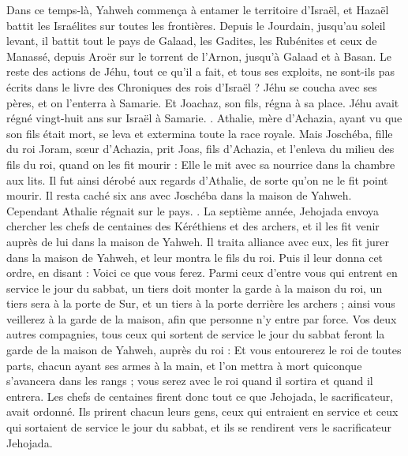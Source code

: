 \begin{multicols}{2}
Dans ce temps-là, Yahweh commença à entamer le territoire d'Israël, et Hazaël battit les Israélites sur toutes les frontières.
Depuis le Jourdain, jusqu'au soleil levant, il battit tout le pays de Galaad, les Gadites, les Rubénites et ceux de Manassé, depuis Aroër sur le torrent de l'Arnon, jusqu'à Galaad et à Basan.
Le reste des actions de Jéhu, tout ce qu'il a fait, et tous ses exploits, ne sont-ils pas écrits dans le livre des Chroniques des rois d'Israël ?
Jéhu se coucha avec ses pères, et on l'enterra à Samarie. Et Joachaz, son fils, régna à sa place.
Jéhu avait régné vingt-huit ans sur Israël à Samarie.
.
\VerseOne{}Athalie, mère d'Achazia, ayant vu que son fils était mort, se leva et extermina toute la race royale.
Mais Joschéba, fille du roi Joram, sœur d'Achazia, prit Joas, fils d'Achazia, et l'enleva du milieu des fils du roi, quand on les fit mourir : Elle le mit avec sa nourrice dans la chambre aux lits. Il fut ainsi dérobé aux regards d'Athalie, de sorte qu'on ne le fit point mourir.
Il resta caché six ans avec Joschéba dans la maison de Yahweh. Cependant Athalie régnait sur le pays.
.
La septième année, Jehojada envoya chercher les chefs de centaines des Kéréthiens et des archers, et il les fit venir auprès de lui dans la maison de Yahweh. Il traita alliance avec eux, les fit jurer dans la maison de Yahweh, et leur montra le fils du roi.
Puis il leur donna cet ordre, en disant : Voici ce que vous ferez. Parmi ceux d'entre vous qui entrent en service le jour du sabbat, un tiers doit monter la garde à la maison du roi,
un tiers sera à la porte de Sur, et un tiers à la porte derrière les archers ; ainsi vous veillerez à la garde de la maison, afin que personne n'y entre par force.
Vos deux autres compagnies, tous ceux qui sortent de service le jour du sabbat feront la garde de la maison de Yahweh, auprès du roi :
Et vous entourerez le roi de toutes parts, chacun ayant ses armes à la main, et l'on mettra à mort quiconque s'avancera dans les rangs ; vous serez avec le roi quand il sortira et quand il entrera.
Les chefs de centaines firent donc tout ce que Jehojada, le sacrificateur, avait ordonné. Ils prirent chacun leurs gens, ceux qui entraient en service et ceux qui sortaient de service le jour du sabbat, et ils se rendirent vers le sacrificateur Jehojada.

\end{multicols}
